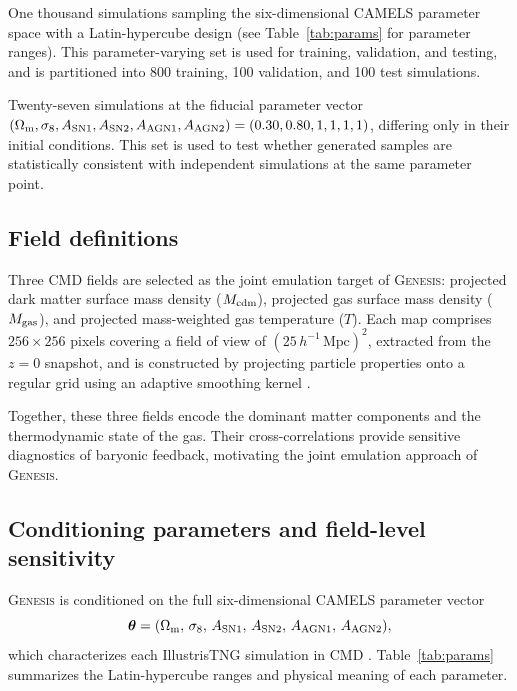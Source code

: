 \documentclass{article}
\newcommand{\Mcdm}{M_{\rm cdm}}
\newcommand{\Mgas}{M_{\rm gas}}
\newcommand{\Tgas}{T}
\newcommand{\Om}{\Omega_{\rm m}}
\newcommand{\sig}{\sigma_8}
\begin{document}
\begin{description}[font=\normalfont\bfseries,leftmargin=2.2em,labelsep=0.6em]
  \item[LH set.] One thousand simulations sampling the
        six-dimensional CAMELS parameter space with a Latin-hypercube
        design (see Table~\ref{tab:params} for parameter ranges).
        This parameter-varying set is used for training, validation,
        and testing, and is partitioned into 800 training, 100
        validation, and 100 test simulations.
  \item[CV set.] Twenty-seven simulations at the fiducial parameter
        vector $(\Om, \sig, A_{\rm SN1}, A_{\rm SN2}, A_{\rm AGN1},
        A_{\rm AGN2}) = (0.30, 0.80, 1, 1, 1, 1)$, differing only
        in their initial conditions. This set is used to test whether
        generated samples are statistically consistent with
        independent simulations at the same parameter point.
\end{description}

\subsection{Field definitions}
\label{sec:fields}

Three CMD fields are selected as the joint emulation target of
\textsc{Genesis}: projected dark matter surface mass density
($\Mcdm$), projected gas surface mass density ($\Mgas$), and projected
mass-weighted gas temperature ($\Tgas$). Each map comprises
$256\times256$ pixels covering a field of view of
$(25\,h^{-1}\,\mathrm{Mpc})^2$, extracted from the $z=0$ snapshot, and
is constructed by projecting particle properties onto a regular grid
using an adaptive smoothing kernel \citep{Villaescusa2022}.

Together, these three fields encode the dominant matter components and
the thermodynamic state of the gas. Their cross-correlations provide
sensitive diagnostics of baryonic feedback, motivating the joint
emulation approach of \textsc{Genesis}.

\subsection{Conditioning parameters and field-level sensitivity}
\label{sec:params}

\textsc{Genesis} is conditioned on the full six-dimensional CAMELS
parameter vector
\begin{equation}
  \boldsymbol{\theta} =
  (\Om,\,\sig,\,A_{\rm SN1},\,A_{\rm SN2},\,A_{\rm AGN1},\,A_{\rm AGN2}),
  \label{eq:theta}
\end{equation}
which characterizes each IllustrisTNG simulation in CMD
\citep{Villaescusa2021,Villaescusa2022}.
Table~\ref{tab:params} summarizes the Latin-hypercube ranges and
physical meaning of each parameter.
\end{document}
